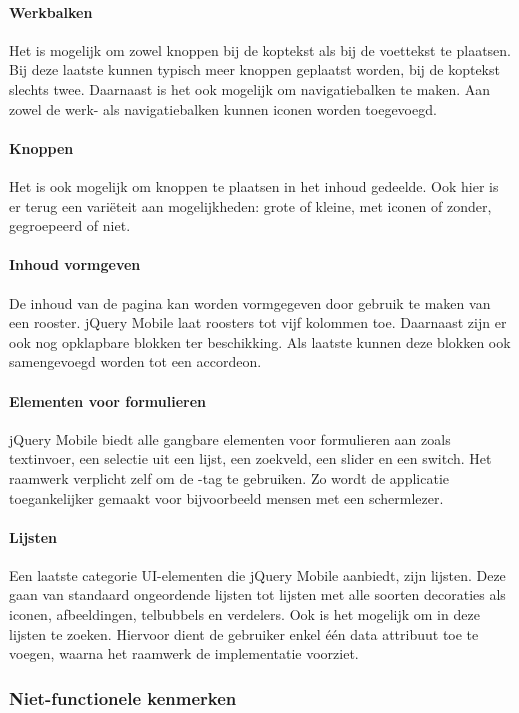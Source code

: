 \paragraph{Werkbalken}
Het is mogelijk om zowel knoppen bij de koptekst als bij de voettekst te plaatsen. Bij deze laatste kunnen typisch meer knoppen geplaatst worden, bij de koptekst slechts twee. Daarnaast is het ook mogelijk om navigatiebalken te maken. Aan zowel de werk- als navigatiebalken kunnen iconen worden toegevoegd.

\paragraph{Knoppen}
Het is ook mogelijk om knoppen te plaatsen in het inhoud gedeelde. Ook hier is er terug een variëteit aan mogelijkheden: grote of kleine, met iconen of zonder, gegroepeerd of niet. 

\paragraph{Inhoud vormgeven}
De inhoud van de pagina kan worden vormgegeven door gebruik te maken van een rooster. jQuery Mobile laat roosters tot vijf kolommen toe. Daarnaast zijn er ook nog opklapbare blokken ter beschikking. Als laatste kunnen deze blokken ook samengevoegd worden tot een accordeon. 

\paragraph{Elementen voor formulieren}
jQuery Mobile biedt alle gangbare elementen voor formulieren aan zoals textinvoer, een selectie uit een lijst, een zoekveld, een slider en een switch. Het raamwerk verplicht zelf om de -tag te gebruiken. Zo wordt de applicatie toegankelijker gemaakt voor bijvoorbeeld mensen met een schermlezer.

\paragraph{Lijsten}
Een laatste categorie UI-elementen die jQuery Mobile aanbiedt, zijn lijsten. Deze gaan van standaard ongeordende lijsten tot lijsten met alle soorten decoraties als iconen, afbeeldingen, telbubbels en verdelers. Ook is het mogelijk om in deze lijsten te zoeken. Hiervoor dient de gebruiker enkel één data attribuut toe te voegen, waarna het raamwerk de implementatie voorziet. 

\subsubsection{Niet-functionele kenmerken}
